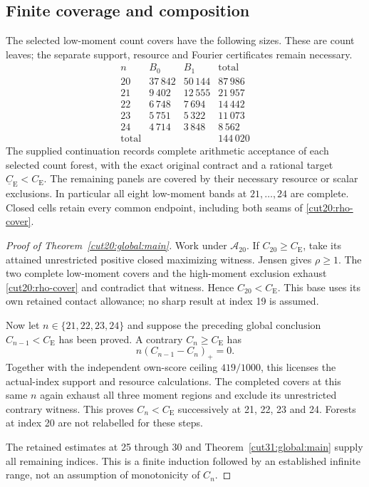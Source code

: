 \documentclass[11pt,a4paper]{article}
\numberwithin{equation}{section}
\theoremstyle{definition}
\theoremstyle{remark}
\newcommand{\CE}{C_{\mathrm E}}
\begin{document}
\subsection{Finite coverage and composition}
The selected low-moment count covers have the following sizes.
These are count leaves; the separate support, resource and Fourier
certificates remain necessary.
\[
\begin{array}{c|rrr}
 n&B_0&B_1&\text{total}\\\hline
 20&37\,842&50\,144&87\,986\\
 21&9\,402&12\,555&21\,957\\
 22&6\,748&7\,694&14\,442\\
 23&5\,751&5\,322&11\,073\\
 24&4\,714&3\,848&8\,562\\\hline
 \text{total}&&&144\,020
\end{array}
\]
The supplied continuation records complete arithmetic acceptance
of each selected count forest, with the exact original contract
and a rational target \(\underline C_{\mathrm E}<\CE\).
The remaining panels are covered by their necessary resource or
scalar exclusions. In particular all eight low-moment bands at
\(21,\ldots,24\) are complete. Closed cells retain every common
endpoint, including both seams of \eqref{cut20:rho-cover}.

\begin{proof}[Proof of Theorem~\ref{cut20:global:main}]
Work under \(\mathcal A_{20}\). If \(C_{20}\ge\CE\), take
its attained unrestricted positive closed maximizing witness.
Jensen gives \(\rho\ge1\). The two complete low-moment covers
and the high-moment exclusion exhaust \eqref{cut20:rho-cover}
and contradict that witness. Hence \(C_{20}<\CE\).
This base uses its own retained contact allowance; no sharp result
at index 19 is assumed.

Now let \(n\in\{21,22,23,24\}\) and suppose the preceding
global conclusion \(C_{n-1}<\CE\) has been proved. A contrary
\(C_n\ge\CE\) has
\[
 n(C_{n-1}-C_n)_+=0.
\]
Together with the independent own-score ceiling \(419/1000\),
this licenses the actual-index support and resource calculations.
The completed covers at this same \(n\) again exhaust all three
moment regions and exclude its unrestricted contrary witness.
This proves \(C_n<\CE\) successively at 21, 22, 23 and 24.
Forests at index 20 are not relabelled for these steps.

The retained estimates at 25 through 30 and
Theorem~\ref{cut31:global:main} supply all remaining indices.
This is a finite induction followed by an established infinite
range, not an assumption of monotonicity of \(C_n\).
\end{proof}
\end{document}
